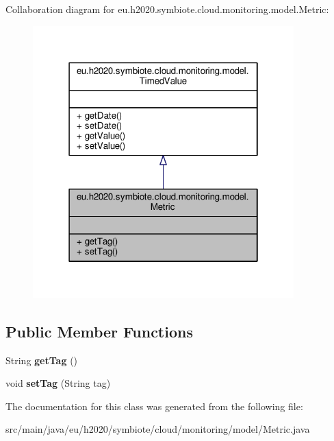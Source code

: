 Collaboration diagram for eu.\+h2020.\+symbiote.\+cloud.\+monitoring.\+model.\+Metric\+:
\nopagebreak
\begin{figure}[H]
\begin{center}
\leavevmode
\includegraphics[width=286pt]{classeu_1_1h2020_1_1symbiote_1_1cloud_1_1monitoring_1_1model_1_1Metric__coll__graph}
\end{center}
\end{figure}
\subsection*{Public Member Functions}
\begin{DoxyCompactItemize}
\item 
\mbox{\label{classeu_1_1h2020_1_1symbiote_1_1cloud_1_1monitoring_1_1model_1_1Metric_ae31cc027a1129fa9947350053cf8e058}} 
String {\bfseries get\+Tag} ()
\item 
\mbox{\label{classeu_1_1h2020_1_1symbiote_1_1cloud_1_1monitoring_1_1model_1_1Metric_ab94fb1d4ce14c9ead753090bc89e9e9a}} 
void {\bfseries set\+Tag} (String tag)
\end{DoxyCompactItemize}


The documentation for this class was generated from the following file\+:\begin{DoxyCompactItemize}
\item 
src/main/java/eu/h2020/symbiote/cloud/monitoring/model/Metric.\+java\end{DoxyCompactItemize}
